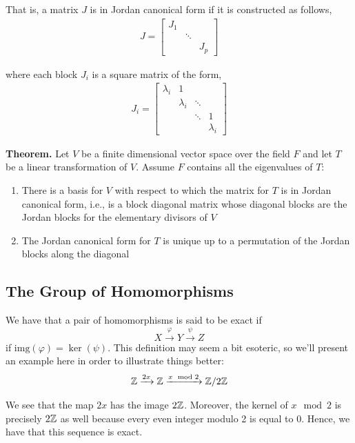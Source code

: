 \documentclass[11pt, reqno]{amsart}
\theoremstyle{plain}
\theoremstyle{definition}
\theoremstyle{example}
\begin{document}
That is, a matrix $J$ is in Jordan canonical form if it is constructed as follows,
\begin{align*}
J = \begin{bmatrix}
J_1 & \;     & \; \\
\;  & \ddots & \; \\ 
\;  & \;     & J_p\end{bmatrix}
\end{align*}

where each block $J_i$ is a square matrix of the form,
\begin{align*}
J_i = \begin{bmatrix}
\lambda_i & 1            & \;     & \;  \\
\;        & \lambda_i    & \ddots & \;  \\
\;        & \;           & \ddots & 1   \\
\;        & \;           & \;     & \lambda_i       
\end{bmatrix}
\end{align*}

\par
\textbf{Theorem.} Let $V$ be a finite dimensional vector space over the field $F$ and let $T$ be a linear transformation of $V$. Assume $F$ contains all the eigenvalues of $T$:
\begin{enumerate}
\item There is a basis for $V$ with respect to which the matrix for $T$ is in Jordan canonical form, i.e., is a block diagonal matrix whose diagonal blocks are the Jordan blocks for the elementary divisors of $V$
\item The Jordan canonical form for $T$ is unique up to a permutation of the Jordan blocks along the diagonal
\end{enumerate}

\subsection{The Group of Homomorphisms}

We have that a pair of homomorphisms is said to be exact if $$X \xrightarrow{\varphi} Y \xrightarrow{\psi} Z$$ if $\text{img}(\varphi) = \ker(\psi)$. This definition may seem a bit esoteric, so we'll present an example here in order to illustrate things better:
\begin{align*}
\mathbb{Z} \xrightarrow{2x} \mathbb{Z} \xrightarrow{x \mod 2} \mathbb{Z}/2\mathbb{Z}
\end{align*}

We see that the map $2x$ has the image $2\mathbb{Z}$. Moreover, the kernel of $x \mod 2$ is precisely $2\mathbb{Z}$ as well because every even integer modulo 2 is equal to $0$. Hence, we have that this sequence is exact.
\end{document}
